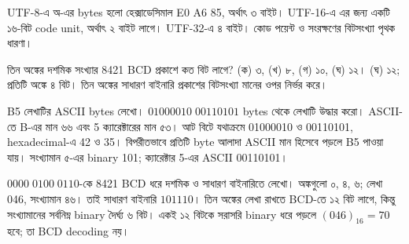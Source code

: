 \chThreeAnswer UTF-8-এ অ-এর bytes হলো হেক্সাডেসিমাল \textenglish{E0 A6 85}, অর্থাৎ ৩ বাইট। UTF-16-এ এর জন্য একটি ১৬-বিট code unit, অর্থাৎ ২ বাইট লাগে। UTF-32-এ ৪ বাইট। কোড পয়েন্ট ও সংরক্ষণের বিটসংখ্যা পৃথক ধারণা।

তিন অঙ্কের দশমিক সংখ্যার 8421 BCD প্রকাশে কত বিট লাগে? (ক) ৩, (খ) ৮, (গ) ১০, (ঘ) ১২।
\chThreeAnswer (ঘ) ১২; প্রতিটি অঙ্কে ৪ বিট। তিন অঙ্কের সাধারণ বাইনারি প্রকাশের বিটসংখ্যা মানের ওপর নির্ভর করে।

\textenglish{B5} লেখাটির ASCII bytes লেখো। $01000010\;00110101$ bytes থেকে লেখাটি উদ্ধার করো।
\chThreeAnswer ASCII-তে B-এর মান ৬৬ এবং 5 ক্যারেক্টারের মান ৫৩। আট বিটে যথাক্রমে 01000010 ও 00110101, hexadecimal-এ 42 ও 35। বিপরীতভাবে প্রতিটি byte আলাদা ASCII মান হিসেবে পড়লে B5 পাওয়া যায়। সংখ্যামান ৫-এর binary 101; ক্যারেক্টার 5-এর ASCII 00110101।

$0000\;0100\;0110$-কে 8421 BCD ধরে দশমিক ও সাধারণ বাইনারিতে লেখো।
\chThreeAnswer অঙ্কগুলো ০, ৪, ৬; লেখা 046, সংখ্যামান ৪৬। তাই সাধারণ বাইনারি $101110$। তিন অঙ্কের লেখা রাখতে BCD-তে ১২ বিট লাগে, কিন্তু সংখ্যামানের সর্বনিম্ন binary দৈর্ঘ্য ৬ বিট। একই ১২ বিটকে সরাসরি binary ধরে পড়লে $(046)_{16}=70$ হবে; তা BCD decoding নয়।
